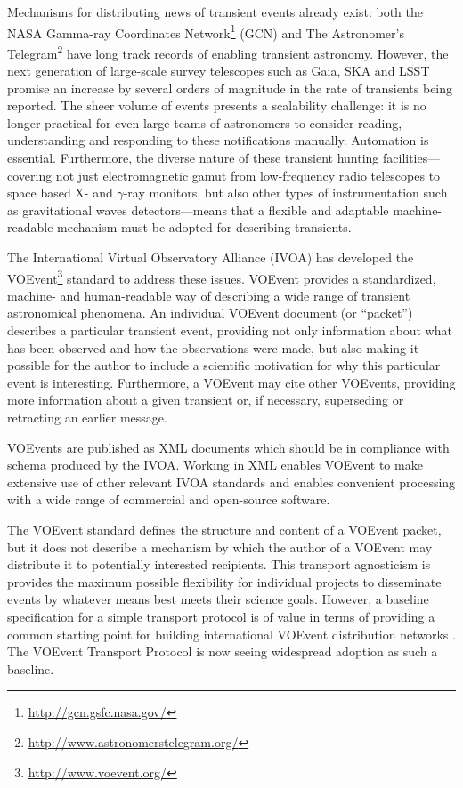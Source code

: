 \documentclass[5p,authoryear]{elsarticle}
\begin{document}
Mechanisms for distributing news of transient events already exist: both the
NASA Gamma-ray Coordinates Network\footnote{\url{http://gcn.gsfc.nasa.gov/}}
(GCN) and The Astronomer's
Telegram\footnote{\url{http://www.astronomerstelegram.org/}} have long track
records of enabling transient astronomy. However, the next generation of
large-scale survey telescopes such as Gaia, SKA and LSST promise an increase
by several orders of magnitude in the rate of transients being reported.  The
sheer volume of events presents a scalability challenge: it is no longer
practical for even large teams of astronomers to consider reading,
understanding and responding to these notifications manually. Automation is
essential. Furthermore, the diverse nature of these transient hunting
facilities---covering not just electromagnetic gamut from low-frequency radio
telescopes to space based X- and $\gamma$-ray monitors, but also other types
of instrumentation such as gravitational waves detectors---means that a
flexible and adaptable machine-readable mechanism must be adopted for
describing transients.

The International Virtual Observatory Alliance (IVOA) has developed the
VOEvent\footnote{\url{http://www.voevent.org/}} \citep{Seaman:2011} standard
to address these issues. VOEvent provides a standardized, machine- and
human-readable way of describing a wide range of transient astronomical
phenomena. An individual VOEvent document (or ``packet'') describes a
particular transient event, providing not only information about what has been
observed and how the observations were made, but also making it possible for
the author to include a scientific motivation for why this particular event is
interesting.  Furthermore, a VOEvent may cite other VOEvents, providing more
information about a given transient or, if necessary, superseding or
retracting an earlier message.

VOEvents are published as XML \citep{Bray:2008} documents which should be in
compliance with schema \citep{Gau:2012, Peterson:2012} produced by the IVOA\@.
Working in XML enables VOEvent to make extensive use of other relevant IVOA
standards and enables convenient processing with a wide range of commercial
and open-source software.

The VOEvent standard defines the structure and content of a VOEvent packet,
but it does not describe a mechanism by which the author of a VOEvent may
distribute it to potentially interested recipients. This transport agnosticism
is provides the maximum possible flexibility for individual projects to
disseminate events by whatever means best meets their science goals. However,
a baseline specification for a simple transport protocol is of value in terms
of providing a common starting point for building international VOEvent
distribution networks \citep{Williams:2012}.  The VOEvent Transport Protocol
\citep[VTP;][]{Allan:2009} is now seeing widespread adoption as such a
baseline.
\end{document}

